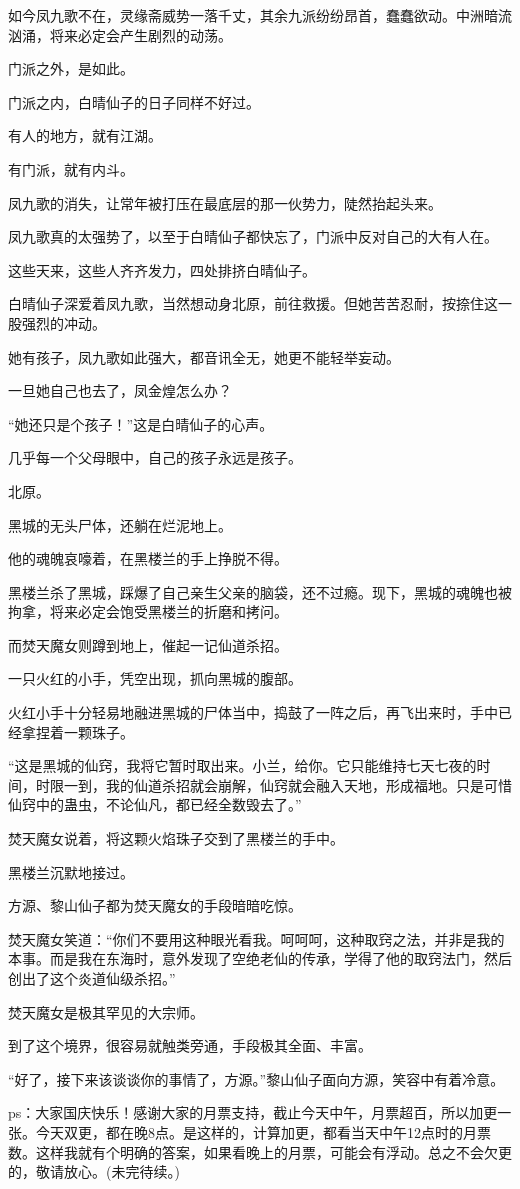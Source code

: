 \begin{this_body}
如今凤九歌不在，灵缘斋威势一落千丈，其余九派纷纷昂首，蠢蠢欲动。中洲暗流汹涌，将来必定会产生剧烈的动荡。

门派之外，是如此。

门派之内，白晴仙子的日子同样不好过。

有人的地方，就有江湖。

有门派，就有内斗。

凤九歌的消失，让常年被打压在最底层的那一伙势力，陡然抬起头来。

凤九歌真的太强势了，以至于白晴仙子都快忘了，门派中反对自己的大有人在。

这些天来，这些人齐齐发力，四处排挤白晴仙子。

白晴仙子深爱着凤九歌，当然想动身北原，前往救援。但她苦苦忍耐，按捺住这一股强烈的冲动。

她有孩子，凤九歌如此强大，都音讯全无，她更不能轻举妄动。

一旦她自己也去了，凤金煌怎么办？

“她还只是个孩子！”这是白晴仙子的心声。

几乎每一个父母眼中，自己的孩子永远是孩子。

北原。

黑城的无头尸体，还躺在烂泥地上。

他的魂魄哀嚎着，在黑楼兰的手上挣脱不得。

黑楼兰杀了黑城，踩爆了自己亲生父亲的脑袋，还不过瘾。现下，黑城的魂魄也被拘拿，将来必定会饱受黑楼兰的折磨和拷问。

而焚天魔女则蹲到地上，催起一记仙道杀招。

一只火红的小手，凭空出现，抓向黑城的腹部。

火红小手十分轻易地融进黑城的尸体当中，捣鼓了一阵之后，再飞出来时，手中已经拿捏着一颗珠子。

“这是黑城的仙窍，我将它暂时取出来。小兰，给你。它只能维持七天七夜的时间，时限一到，我的仙道杀招就会崩解，仙窍就会融入天地，形成福地。只是可惜仙窍中的蛊虫，不论仙凡，都已经全数毁去了。”

焚天魔女说着，将这颗火焰珠子交到了黑楼兰的手中。

黑楼兰沉默地接过。

方源、黎山仙子都为焚天魔女的手段暗暗吃惊。

焚天魔女笑道：“你们不要用这种眼光看我。呵呵呵，这种取窍之法，并非是我的本事。而是我在东海时，意外发现了空绝老仙的传承，学得了他的取窍法门，然后创出了这个炎道仙级杀招。”

焚天魔女是极其罕见的大宗师。

到了这个境界，很容易就触类旁通，手段极其全面、丰富。

“好了，接下来该谈谈你的事情了，方源。”黎山仙子面向方源，笑容中有着冷意。

ps：大家国庆快乐！感谢大家的月票支持，截止今天中午，月票超百，所以加更一张。今天双更，都在晚8点。是这样的，计算加更，都看当天中午12点时的月票数。这样我就有个明确的答案，如果看晚上的月票，可能会有浮动。总之不会欠更的，敬请放心。(未完待续。)

\end{this_body}

